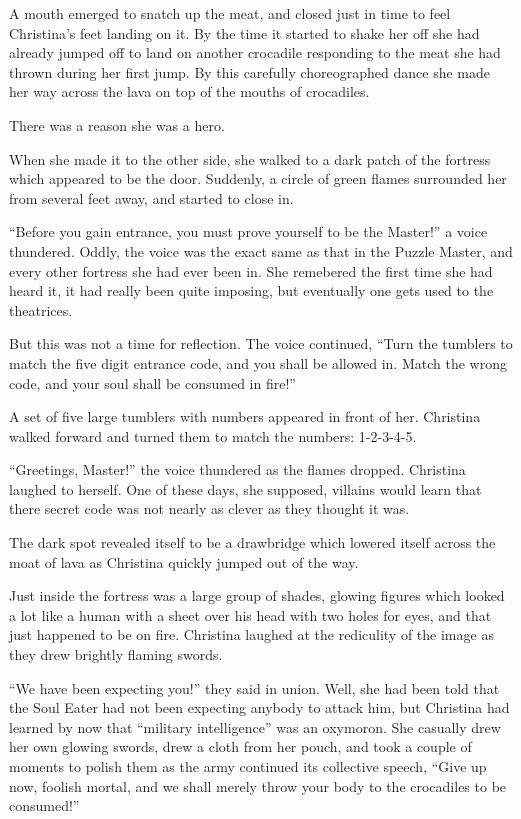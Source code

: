 \documentclass[showtrims,b6paper,draft,10pt]{memoir}
\begin{document}
A mouth emerged to snatch up the meat, and closed just in time to feel Christina's feet landing on it.  By the time it started to shake her off she had already jumped off to land on another crocadile responding to the meat she had thrown during her first jump.  By this carefully choreographed dance she made her way across the lava on top of the mouths of crocadiles.

There was a reason she was a hero.

When she made it to the other side, she walked to a dark patch of the fortress which appeared to be the door.  Suddenly, a circle of green flames surrounded her from several feet away, and started to close in.

``Before you gain entrance, you must prove yourself to be the Master!'' a voice thundered.  Oddly, the voice was the exact same as that in the Puzzle Master, and every other fortress she had ever been in.  She remebered the first time she had heard it, it had really been quite imposing, but eventually one gets used to the theatrices.

But this was not a time for reflection.  The voice continued,  ``Turn the tumblers to match the five digit entrance code, and you shall be allowed in.  Match the wrong code, and your soul shall be consumed in fire!''

A set of five large tumblers with numbers appeared in front of her.  Christina walked forward and turned them to match the numbers: 1-2-3-4-5.

``Greetings, Master!'' the voice thundered as the flames dropped.  Christina laughed to herself.  One of these days, she supposed, villains would learn that there secret code was not nearly as clever as they thought it was.

The dark spot revealed itself to be a drawbridge which lowered itself across the moat of lava as Christina quickly jumped out of the way.

Just inside the fortress was a large group of shades, glowing figures which looked a lot like a human with a sheet over his head with two holes for eyes, and that just happened to be on fire.  Christina laughed at the rediculity of the image as they drew brightly flaming swords.

``We have been expecting you!'' they said in union.  Well, she had been told that the Soul Eater had not been expecting anybody to attack him, but Christina had learned by now that ``military intelligence'' was an oxymoron.  She casually drew her own glowing swords, drew a cloth from her pouch, and took a couple of moments to polish them as the army continued its collective speech, ``Give up now, foolish mortal, and we shall merely throw your body to the crocadiles to be consumed!''
\end{document}
